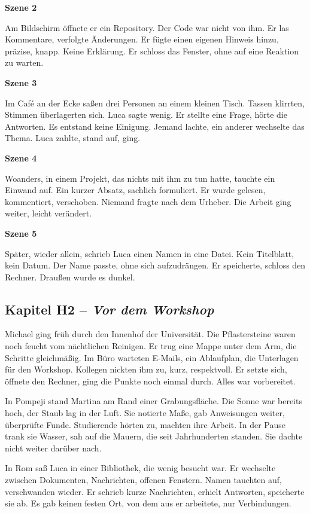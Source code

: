 \documentclass[
]{article}
\begin{document}
\textbf{Szene 2}

Am Bildschirm öffnete er ein Repository. Der Code war nicht von ihm. Er las Kommentare, verfolgte Änderungen. Er fügte einen eigenen Hinweis hinzu, präzise, knapp. Keine Erklärung. Er schloss das Fenster, ohne auf eine Reaktion zu warten.

\textbf{Szene 3}

Im Café an der Ecke saßen drei Personen an einem kleinen Tisch. Tassen klirrten, Stimmen überlagerten sich. Luca sagte wenig. Er stellte eine Frage, hörte die Antworten. Es entstand keine Einigung. Jemand lachte, ein anderer wechselte das Thema. Luca zahlte, stand auf, ging.

\textbf{Szene 4}

Woanders, in einem Projekt, das nichts mit ihm zu tun hatte, tauchte ein Einwand auf. Ein kurzer Absatz, sachlich formuliert. Er wurde gelesen, kommentiert, verschoben. Niemand fragte nach dem Urheber. Die Arbeit ging weiter, leicht verändert.

\textbf{Szene 5}

Später, wieder allein, schrieb Luca einen Namen in eine Datei. Kein Titelblatt, kein Datum. Der Name passte, ohne sich aufzudrängen. Er speicherte, schloss den Rechner. Draußen wurde es dunkel.

\subsection{\texorpdfstring{Kapitel H2 -- \emph{Vor dem Workshop}}{Kapitel H2 -- Vor dem Workshop}}\label{kapitel-h2-vor-dem-workshop}

Michael ging früh durch den Innenhof der Universität. Die Pflastersteine waren noch feucht vom nächtlichen Reinigen. Er trug eine Mappe unter dem Arm, die Schritte gleichmäßig. Im Büro warteten E-Mails, ein Ablaufplan, die Unterlagen für den Workshop. Kollegen nickten ihm zu, kurz, respektvoll. Er setzte sich, öffnete den Rechner, ging die Punkte noch einmal durch. Alles war vorbereitet.

In Pompeji stand Martina am Rand einer Grabungsfläche. Die Sonne war bereits hoch, der Staub lag in der Luft. Sie notierte Maße, gab Anweisungen weiter, überprüfte Funde. Studierende hörten zu, machten ihre Arbeit. In der Pause trank sie Wasser, sah auf die Mauern, die seit Jahrhunderten standen. Sie dachte nicht weiter darüber nach.

In Rom saß Luca in einer Bibliothek, die wenig besucht war. Er wechselte zwischen Dokumenten, Nachrichten, offenen Fenstern. Namen tauchten auf, verschwanden wieder. Er schrieb kurze Nachrichten, erhielt Antworten, speicherte sie ab. Es gab keinen festen Ort, von dem aus er arbeitete, nur Verbindungen.
\end{document}
